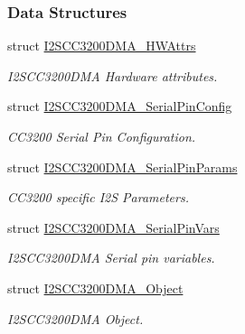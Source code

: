\subsubsection*{Data Structures}
\begin{DoxyCompactItemize}
\item 
struct \hyperlink{struct_i2_s_c_c3200_d_m_a___h_w_attrs}{I2\+S\+C\+C3200\+D\+M\+A\+\_\+\+H\+W\+Attrs}
\begin{DoxyCompactList}\small\item\em I2\+S\+C\+C3200\+D\+M\+A Hardware attributes. \end{DoxyCompactList}\item 
struct \hyperlink{struct_i2_s_c_c3200_d_m_a___serial_pin_config}{I2\+S\+C\+C3200\+D\+M\+A\+\_\+\+Serial\+Pin\+Config}
\begin{DoxyCompactList}\small\item\em C\+C3200 Serial Pin Configuration. \end{DoxyCompactList}\item 
struct \hyperlink{struct_i2_s_c_c3200_d_m_a___serial_pin_params}{I2\+S\+C\+C3200\+D\+M\+A\+\_\+\+Serial\+Pin\+Params}
\begin{DoxyCompactList}\small\item\em C\+C3200 specific I2\+S Parameters. \end{DoxyCompactList}\item 
struct \hyperlink{struct_i2_s_c_c3200_d_m_a___serial_pin_vars}{I2\+S\+C\+C3200\+D\+M\+A\+\_\+\+Serial\+Pin\+Vars}
\begin{DoxyCompactList}\small\item\em I2\+S\+C\+C3200\+D\+M\+A Serial pin variables. \end{DoxyCompactList}\item 
struct \hyperlink{struct_i2_s_c_c3200_d_m_a___object}{I2\+S\+C\+C3200\+D\+M\+A\+\_\+\+Object}
\begin{DoxyCompactList}\small\item\em I2\+S\+C\+C3200\+D\+M\+A Object. \end{DoxyCompactList}\end{DoxyCompactItemize}
